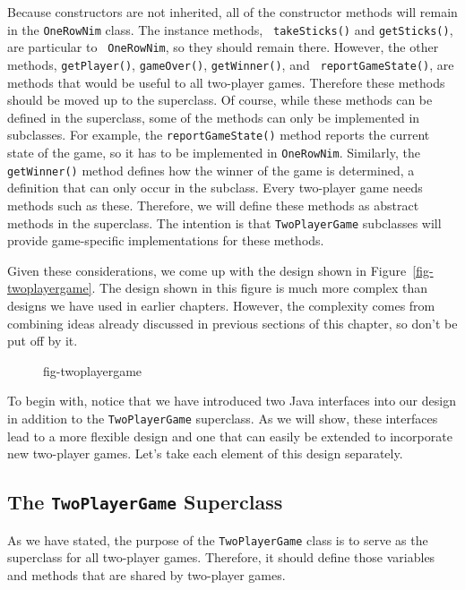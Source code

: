Because constructors are not inherited, all of the constructor methods
will remain in the {\tt OneRowNim} class. The instance methods, {\tt
takeSticks()} and {\tt getSticks()}, are particular to {\tt
OneRowNim}, so they should remain there. However, the other methods,
{\tt getPlayer()}, {\tt gameOver()}, {\tt getWinner()}, and {\tt
reportGameState()}, are methods that would be useful to all two-player
games. Therefore these methods should be moved up to the superclass.
Of course, while these methods can be defined in the superclass, some
of the methods can only be implemented in subclasses.  For example,
the {\tt reportGameState()} method reports the current state of the
game, so it has to be implemented in {\tt OneRowNim}. Similarly, the
{\tt getWinner()} method defines how the winner of the game is
determined, a definition that can only occur in the subclass. Every
two-player game needs methods such as these. Therefore, we will define
these methods as abstract methods in the superclass.  The intention is
that {\tt TwoPlayerGame} subclasses will provide game-specific
implementations for these methods.

Given these considerations, we come up with the design shown in
Figure~\ref{fig-twoplayergame}.  The design shown in this figure
is much more complex than designs we have used in earlier chapters.
However, the complexity comes from combining ideas already
discussed in previous sections of this chapter, so don't be put
off by it.

\begin{figure}[h!]
 {fig-twoplayergame}

\end{figure}

To begin with, notice that we have introduced two Java interfaces into
our design in addition to the {\tt TwoPlayerGame} superclass.  As we
will show, these interfaces lead to a more flexible design and one
that can easily be extended to incorporate new two-player games. Let's
take each element of this design separately.

\subsection{The {\tt TwoPlayerGame} Superclass}

As we have stated, the purpose of the {\tt TwoPlayerGame} class is to
serve as the superclass for all two-player games. Therefore, it should
define those variables and methods that are shared by
two-player games. 


